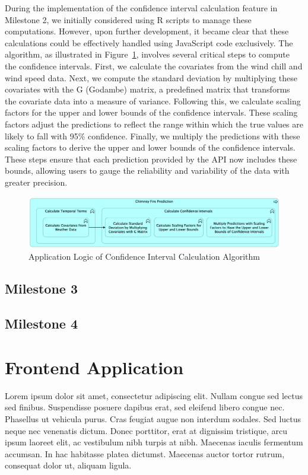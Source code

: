 \documentclass{utitcphd_overleaf}
\begin{document}
During the implementation of the confidence interval calculation feature in Milestone 2, we initially considered using R scripts to manage these computations. However, upon further development, it became clear that these calculations could be effectively handled using JavaScript code exclusively. The algorithm, as illustrated in Figure~\ref{fig:m2_CI_logic}, involves several critical steps to compute the confidence intervals. First, we calculate the covariates from the wind chill and wind speed data. Next, we compute the standard deviation by multiplying these covariates with the G (Godambe) matrix, a predefined matrix that transforms the covariate data into a measure of variance. Following this, we calculate scaling factors for the upper and lower bounds of the confidence intervals. These scaling factors adjust the predictions to reflect the range within which the true values are likely to fall with 95\% confidence. Finally, we multiply the predictions with these scaling factors to derive the upper and lower bounds of the confidence intervals. These steps ensure that each prediction provided by the API now includes these bounds, allowing users to gauge the reliability and variability of the data with greater precision.

\begin{figure}[ht]
  \centering
  \includegraphics[width=1\textwidth]{my_images/milestones/m2_CI_logic.png}
  \caption{Application Logic of Confidence Interval Calculation Algorithm}
  \label{fig:m2_CI_logic}
\end{figure}

\subsection{Milestone 3}
\subsection{Milestone 4}

\section{Frontend Application}

Lorem ipsum dolor sit amet, consectetur adipiscing elit. Nullam congue sed lectus sed finibus. Suspendisse posuere dapibus erat, sed eleifend libero congue nec. Phasellus ut vehicula purus. Cras feugiat augue non interdum sodales. Sed luctus neque nec venenatis dictum. Donec porttitor, erat at dignissim tristique, arcu ipsum laoreet elit, ac vestibulum nibh turpis at nibh. Maecenas iaculis fermentum accumsan. In hac habitasse platea dictumst. Maecenas auctor tortor rutrum, consequat dolor ut, aliquam ligula.
\end{document}
